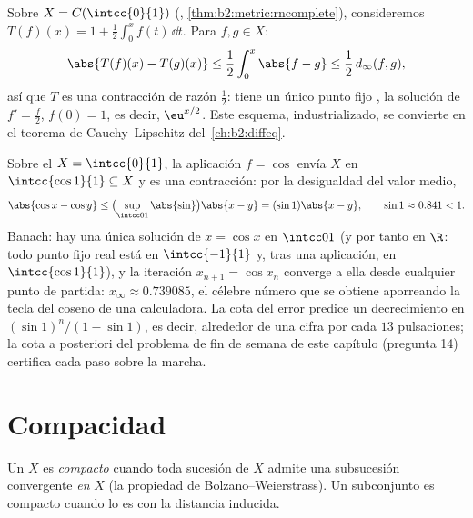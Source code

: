 \begin{example}\label{ex:b2:metric:integralequation}
Sobre $X = C(\intcc{0}{1})$ (,
\cref{thm:b2:metric:rncomplete}), consideremos $T(f)(x) = 1 +
\frac12 \int_0^x f(t)\,\dd t$. Para $f, g \in X$:
\[
\abs{T(f)(x) - T(g)(x)} \leq \frac12 \int_0^x \abs{f - g} \leq
\frac12\, d_\infty(f, g),
\]
así que $T$ es una contracción de razón $\frac12$: tiene un único
punto fijo , la solución de $f' = \frac f2$, $f(0) = 1$, es
decir, $\eu^{x/2}$. Este esquema, industrializado, se convierte en
el teorema de Cauchy--Lipschitz del~\cref{ch:b2:diffeq}.
\end{example}

\begin{example}[Un punto fijo numérico: $x = \cos x$]\label{ex:b2:metric:cosfix}
Sobre el  $X = \intcc{0}{1}$, la aplicación $f = \cos$
envía $X$ en $\intcc{\cos 1}{1} \subseteq X$ y es una contracción:
por la desigualdad del valor medio,
\[
\abs{\cos x - \cos y} \leq \bigl(\sup_{\intcc01}\abs{\sin}\bigr)
\abs{x - y} = (\sin 1)\abs{x - y},
\qquad \sin 1 \approx 0.841 < 1 .
\]
Banach: hay una única solución de $x = \cos x$ en $\intcc01$ (y por
tanto en $\R$: todo punto fijo real está en $\intcc{-1}{1}$ y, tras
una aplicación, en $\intcc{\cos 1}{1}$), y la iteración $x_{n+1} =
\cos x_n$ converge a ella desde cualquier punto de partida:
$x_\infty \approx 0.739085$, el célebre número que se obtiene
aporreando la tecla del coseno de una calculadora. La cota del
error predice un decrecimiento en $(\sin1)^n/(1 - \sin1)$, es
decir, alrededor de una cifra por cada $13$ pulsaciones; la cota a
posteriori del problema de fin de semana de este capítulo (pregunta
14) certifica cada paso sobre la marcha.
\end{example}

\section{Compacidad}

\begin{definition}\label{def:b2:metric:compact}
Un  $X$ es \emph{compacto} cuando toda sucesión de $X$ admite una subsucesión
convergente \emph{en} $X$ (la propiedad de Bolzano--Weierstrass). Un
subconjunto es compacto cuando lo es con la distancia inducida.
\end{definition}

